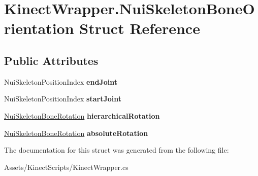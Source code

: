 \hypertarget{struct_kinect_wrapper_1_1_nui_skeleton_bone_orientation}{}\section{Kinect\+Wrapper.\+Nui\+Skeleton\+Bone\+Orientation Struct Reference}
\label{struct_kinect_wrapper_1_1_nui_skeleton_bone_orientation}
\subsection*{Public Attributes}
\begin{DoxyCompactItemize}
\item 
\mbox{\label{struct_kinect_wrapper_1_1_nui_skeleton_bone_orientation_ae04b67839d0c50106513eac6e4683e78}} 
Nui\+Skeleton\+Position\+Index {\bfseries end\+Joint}
\item 
\mbox{\label{struct_kinect_wrapper_1_1_nui_skeleton_bone_orientation_a040cf3d6ae0183a745da2bc3a854cd76}} 
Nui\+Skeleton\+Position\+Index {\bfseries start\+Joint}
\item 
\mbox{\label{struct_kinect_wrapper_1_1_nui_skeleton_bone_orientation_aa668c0486f370e2f8a9d58ed59fae259}} 
\mbox{\hyperlink{struct_kinect_wrapper_1_1_nui_skeleton_bone_rotation}{Nui\+Skeleton\+Bone\+Rotation}} {\bfseries hierarchical\+Rotation}
\item 
\mbox{\label{struct_kinect_wrapper_1_1_nui_skeleton_bone_orientation_a65ae077aa43b08196177b17c2718aee9}} 
\mbox{\hyperlink{struct_kinect_wrapper_1_1_nui_skeleton_bone_rotation}{Nui\+Skeleton\+Bone\+Rotation}} {\bfseries absolute\+Rotation}
\end{DoxyCompactItemize}


The documentation for this struct was generated from the following file\+:\begin{DoxyCompactItemize}
\item 
Assets/\+Kinect\+Scripts/Kinect\+Wrapper.\+cs\end{DoxyCompactItemize}
